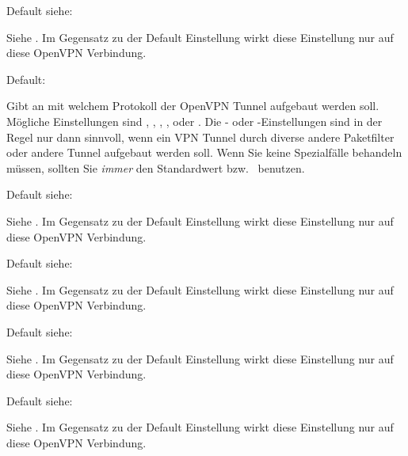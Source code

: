 \begin{description}
  Default siehe: 

  Siehe . Im
  Gegensatz zu der Default Einstellung wirkt diese Einstellung nur auf
  diese OpenVPN Verbindung.


  Default: 

  Gibt an mit welchem Protokoll der OpenVPN Tunnel aufgebaut werden
  soll. Mögliche Einstellungen sind , ,
  , ,  oder
  . Die - oder
  -Einstellungen sind in der Regel nur dann
  sinnvoll, wenn ein VPN Tunnel durch diverse andere Paketfilter oder
  andere Tunnel aufgebaut werden soll. Wenn Sie keine Spezialfälle
  behandeln müssen, sollten Sie \emph{immer} den Standardwert
   bzw.\  benutzen.


  Default siehe: 

  Siehe
  .
  Im Gegensatz zu der Default Einstellung wirkt diese Einstellung nur
  auf diese OpenVPN Verbindung.


  Default siehe: 

  Siehe
  .
  Im Gegensatz zu der Default Einstellung wirkt diese Einstellung nur
  auf diese OpenVPN Verbindung.


  Default siehe: 

  Siehe . Im
  Gegensatz zu der Default Einstellung wirkt diese Einstellung nur auf
  diese OpenVPN Verbindung.


  Default siehe: 

  Siehe . Im
  Gegensatz zu der Default Einstellung wirkt diese Einstellung nur auf
  diese OpenVPN Verbindung.


\end{description}
